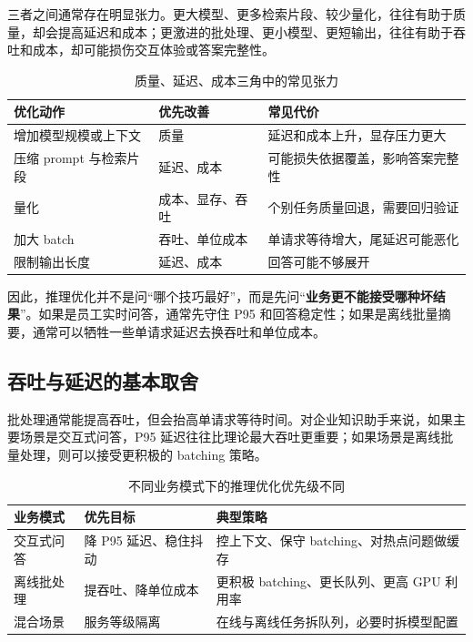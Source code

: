 三者之间通常存在明显张力。更大模型、更多检索片段、较少量化，往往有助于质量，却会提高延迟和成本；更激进的批处理、更小模型、更短输出，往往有助于吞吐和成本，却可能损伤交互体验或答案完整性。

\begin{table}[H]
\centering
\small
\begin{tabularx}{\textwidth}{>{\raggedright\arraybackslash}p{3.4cm}>{\raggedright\arraybackslash}p{3.2cm}>{\raggedright\arraybackslash}X}
\toprule
\textbf{优化动作} & \textbf{优先改善} & \textbf{常见代价} \\
\midrule
增加模型规模或上下文 & 质量 & 延迟和成本上升，显存压力更大 \\
压缩 prompt 与检索片段 & 延迟、成本 & 可能损失依据覆盖，影响答案完整性 \\
量化 & 成本、显存、吞吐 & 个别任务质量回退，需要回归验证 \\
加大 batch & 吞吐、单位成本 & 单请求等待增大，尾延迟可能恶化 \\
限制输出长度 & 延迟、成本 & 回答可能不够展开 \\
\bottomrule
\end{tabularx}
\caption{质量、延迟、成本三角中的常见张力}
\label{tab:quality-latency-cost}
\end{table}

因此，推理优化并不是问“哪个技巧最好”，而是先问“\textbf{业务更不能接受哪种坏结果}”。如果是员工实时问答，通常先守住 P95 和回答稳定性；如果是离线批量摘要，通常可以牺牲一些单请求延迟去换吞吐和单位成本。

\subsection{吞吐与延迟的基本取舍}
批处理通常能提高吞吐，但会抬高单请求等待时间。对企业知识助手来说，如果主要场景是交互式问答，P95 延迟往往比理论最大吞吐更重要；如果场景是离线批量处理，则可以接受更积极的 batching 策略。

\begin{table}[H]
\centering
\small
\begin{tabularx}{\textwidth}{>{\raggedright\arraybackslash}p{3.2cm}>{\raggedright\arraybackslash}p{4cm}>{\raggedright\arraybackslash}X}
\toprule
\textbf{业务模式} & \textbf{优先目标} & \textbf{典型策略} \\
\midrule
交互式问答 & 降 P95 延迟、稳住抖动 & 控上下文、保守 batching、对热点问题做缓存 \\
离线批处理 & 提吞吐、降单位成本 & 更积极 batching、更长队列、更高 GPU 利用率 \\
混合场景 & 服务等级隔离 & 在线与离线任务拆队列，必要时拆模型配置 \\
\bottomrule
\end{tabularx}
\caption{不同业务模式下的推理优化优先级不同}
\label{tab:serving-mode-choice}
\end{table}


